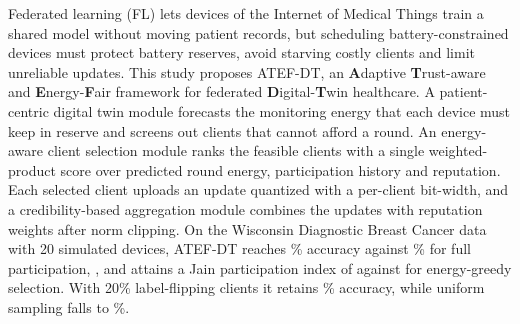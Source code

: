 Federated learning (FL) lets devices of the Internet of Medical Things train a shared model without moving patient records, but scheduling battery-constrained devices must protect battery reserves, avoid starving costly clients and limit unreliable updates. This study proposes ATEF-DT, an \textbf{A}daptive \textbf{T}rust-aware and \textbf{E}nergy-\textbf{F}air framework for federated \textbf{D}igital-\textbf{T}win healthcare. A patient-centric digital twin module forecasts the monitoring energy that each device must keep in reserve and screens out clients that cannot afford a round. An energy-aware client selection module ranks the feasible clients with a single weighted-product score over predicted round energy, participation history and reputation. Each selected client uploads an update quantized with a per-client bit-width, and a credibility-based aggregation module combines the updates with reputation weights after norm clipping.   On the Wisconsin Diagnostic Breast Cancer data with 20 simulated devices, ATEF-DT reaches \% accuracy against \% for full participation, , and attains a Jain participation index of  against  for energy-greedy selection. With 20\% label-flipping clients it retains \% accuracy, while uniform sampling falls to \%.  
